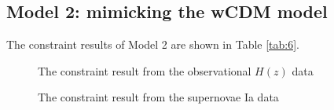 \documentclass[twocolumn]{aastex631}
\begin{document}
\subsection{Model 2: mimicking the wCDM model}

   The constraint results of Model 2 are shown in Table \ref{tab:6}.

   \begin{figure}[htbp]
      \centering
      \caption{The constraint result from the observational
      $H(z)$ data}
   \end{figure}

   \begin{figure}[htbp]
      \centering
      \caption{The constraint result from the supernovae
      Ia data}
   \end{figure}
\end{document}
